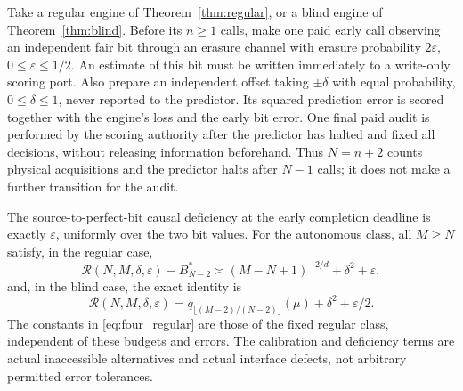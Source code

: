 \begin{corollary}\label{cor:four_resources}
Take a regular engine of Theorem~\ref{thm:regular}, or a blind engine of Theorem~\ref{thm:blind}. Before its $n\ge1$ calls, make one paid early call observing an independent fair bit through an erasure channel with erasure probability $2\varepsilon$, $0\le\varepsilon\le1/2$. An estimate of this bit must be written immediately to a write-only scoring port. Also prepare an independent offset taking $\pm\delta$ with equal probability, $0\le\delta\le1$, never reported to the predictor. Its squared prediction error is scored together with the engine's loss and the early bit error. One final paid audit is performed by the scoring authority after the predictor has halted and fixed all decisions, without releasing information beforehand. Thus $N=n+2$ counts physical acquisitions and the predictor halts after $N-1$ calls; it does not make a further transition for the audit.

The source-to-perfect-bit causal deficiency at the early completion deadline is exactly $\varepsilon$, uniformly over the two bit values. For the autonomous class, all $M\ge N$ satisfy, in the regular case,
\begin{equation}\label{eq:four_regular}
 \mathcal R(N,M,\delta,\varepsilon)-B_{N-2}^*
 \asymp (M-N+1)^{-2/d}+\delta^2+\varepsilon,
\end{equation}
and, in the blind case, the exact identity is
\begin{equation}\label{eq:four_blind}
 \mathcal R(N,M,\delta,\varepsilon)
 =q_{\lfloor(M-2)/(N-2)\rfloor}(\mu)+\delta^2+\varepsilon/2.
\end{equation}
The constants in \eqref{eq:four_regular} are those of the fixed regular class, independent of these budgets and errors. The calibration and deficiency terms are actual inaccessible alternatives and actual interface defects, not arbitrary permitted error tolerances.
\end{corollary}

